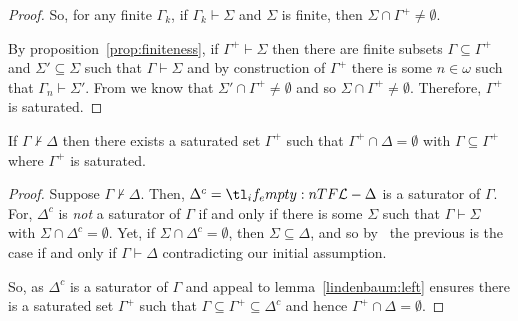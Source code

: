 \documentclass[10pt]{article}
\begin{document}
\begin{lemma}[Lindenbaum]
\begin{proof}
    So, for any finite \(\Gamma_{k}\), if \(\Gamma_{k} \vdash \Sigma\) and \(\Sigma\) is finite, then \(\Sigma \cap \Gamma^{+} \ne \emptyset\).

    By proposition~\ref{prop:finiteness}, if \(\Gamma^{+} \vdash \Sigma\) then there are finite subsets \(\Gamma \subseteq \Gamma^{+}\) and \(\Sigma' \subseteq \Sigma\) such that \(\Gamma \vdash \Sigma\) and by construction of \(\Gamma^{+}\) there is some \(n \in \omega\) such that \(\Gamma_{n} \vdash \Sigma'\).
    From \label{leftLindenbaum:2} we know that \(\Sigma' \cap \Gamma^{+} \ne \emptyset\) and so \(\Sigma \cap \Gamma^{+} \ne \emptyset\).
    Therefore, \(\Gamma^{+}\) is saturated.
  \end{proof}

\end{lemma}

\begin{corollary}[Saturation]\label{col:saturation}
  If \(\Gamma \nvdash \Delta\) then there exists a saturated set \(\Gamma^{+}\) such that \(\Gamma^{+} \cap \Delta = \emptyset\) with \(\Gamma \subseteq \Gamma^{+}\) where \(\Gamma^{+}\) is saturated.
  \begin{proof}
        Suppose \(\Gamma \nvdash \Delta\).
    Then, \(\Delta^{c} = \olang{} - \Delta\) is a saturator of \(\Gamma\).
    For, \(\Delta^{c}\) is \emph{not} a saturator of \(\Gamma\) if and only if there is some \(\Sigma\) such that \(\Gamma \vdash \Sigma\) with \(\Sigma \cap \Delta^{c} = \emptyset\).
    Yet, if \(\Sigma \cap \Delta^{c} = \emptyset\), then \(\Sigma \subseteq \Delta\), and so by \ the previous is the case if and only if \(\Gamma \vdash \Delta\) contradicting our initial assumption.

    So, as \(\Delta^{c}\) is a saturator of \(\Gamma\) and appeal to lemma~\ref{lindenbaum:left} ensures there is a saturated set \(\Gamma^{+}\) such that \(\Gamma \subseteq \Gamma^{+} \subseteq \Delta^{c}\) and hence \(\Gamma^{+} \cap \Delta = \emptyset\).
  \end{proof}
\end{corollary}
\end{document}
